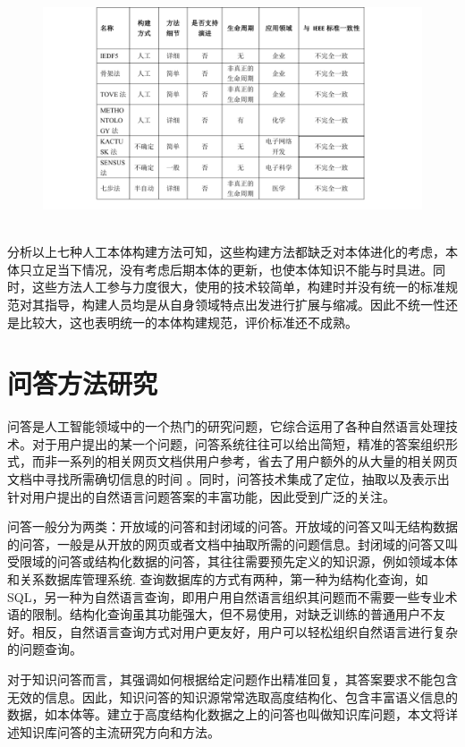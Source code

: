 \begin{figure}[!htb]
	\centering\includegraphics[height=7cm]{resource/onto_method_compare}
	\label{fig:onto_method_compare}
\end{figure}

分析以上七种人工本体构建方法可知，这些构建方法都缺乏对本体进化的考虑，本体只立足当下情况，没有考虑后期本体的更新，也使本体知识不能与时具进。同时，这些方法人工参与力度很大，使用的技术较简单，构建时并没有统一的标准规范对其指导，构建人员均是从自身领域特点出发进行扩展与缩减。因此不统一性还是比较大，这也表明统一的本体构建规范，评价标准还不成熟。

\section{问答方法研究}
问答是人工智能领域中的一个热门的研究问题，它综合运用了各种自然语言处理技术。对于用户提出的某一个问题，问答系统往往可以给出简短，精准的答案组织形式，而非一系列的相关网页文档供用户参考，省去了用户额外的从大量的相关网页文档中寻找所需确切信息的时间\cite{Lu} \cite{Bertola}。同时，问答技术集成了定位，抽取以及表示出针对用户提出的自然语言问题答案的丰富功能，因此受到广泛的关注\cite{Abacha}\cite{Pavli}。

问答一般分为两类：开放域的问答和封闭域的问答。开放域的问答又叫无结构数据的问答，一般是从开放的网页或者文档中抽取所需的问题信息。封闭域的问答又叫受限域的问答或结构化数据的问答，其往往需要预先定义的知识源，例如领域本体和关系数据库管理系统\cite{Dalmas}\cite{Dragoni}. 查询数据库的方式有两种，第一种为结构化查询，如SQL，另一种为自然语言查询，即用户用自然语言组织其问题而不需要一些专业术语的限制\cite{Jagadish}。结构化查询虽其功能强大，但不易使用，对缺乏训练的普通用户不友好。相反，自然语言查询方式对用户更友好，用户可以轻松组织自然语言进行复杂的问题查询。

对于知识问答而言，其强调如何根据给定问题作出精准回复，其答案要求不能包含无效的信息。因此，知识问答的知识源常常选取高度结构化、包含丰富语义信息的数据，如本体等。建立于高度结构化数据之上的问答也叫做知识库问题，本文将详述知识库问答的主流研究方向和方法。

